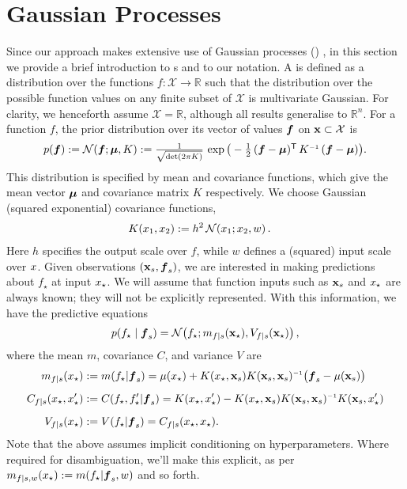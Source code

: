 \documentclass[twoside]{article}
\begin{document}
\section{Gaussian Processes}
Since our  approach makes extensive use of Gaussian processes (\gp) \cite{GPsBook}, in this section we provide a brief introduction to \gp s and to our notation. A \gpb is defined as a distribution over the functions $f: \mathcal{X} \rightarrow \mathbb{R}$ such that the distribution over the possible function values on any finite subset of $\mathcal{X}$ is multivariate Gaussian. For clarity, we henceforth assume $\mathcal{X} = \mathbb{R}$, although all results generalise to $\mathbb{R}^n$. For a function $f$, the prior distribution over its vector of values $\vf$ on $\vlfv \subset \mathcal{X}$ is
\begin{align}%
\textstyle
 \po{\vf}\deq \N{\vf}{\vmu}{K}
 \deq\frac{1}{\sqrt{\det({2\pi K})}}\,\exp \big(-\frac{1}{2}\,(\vf-\vmu)\tra\,K\inv\,(\vf-\vmu)\big).
\end{align}
This distribution is specified by mean and covariance functions, which give the mean vector $\vmu$ and covariance matrix $K$ respectively. 
We choose Gaussian (squared exponential) covariance functions,
\begin{align} \label{eq:Gaussian_cov_fn}
\textstyle
K(\lfv_1,\lfv_2)& \deq h^2\,\N{\lfv_1}{\lfv_2}{w}.
\end{align} 
Here $h$ specifies the output scale over $f$, while $w$ defines a (squared) input scale over $\lfv$. 
Given observations $(\vlfv_s,\vf_s)$, we are interested in making predictions about  $f_\star$ at input $\lfv_\star$. We will assume that function inputs such as $\vlfv_s$ and $\lfv_\star$ are always known; they will not be explicitly represented. With this information, we have the predictive equations
\begin{equation}
 \pskinny{f\st}{\vf_s} = 
\bN{f\st}
{\meancond{f}{\vlfv_\star}{s}}
{\covcond{f}{\vlfv_\star}{s}}\,,
\end{equation}
where the mean $m$, covariance $C$, and variance $V$ are
\begin{align} 
\textstyle
\meancond{f}{\lfv_\star}{s}
& \deq \mean{f_\star}{\vf_s}
= \mu(\lfv_\star)+
K(\lfv_\star,\vlfv_s)
K(\vlfv_s,\vlfv_s)\inv
\bigl(\vf_s-{\mu}(\vlfv_s)\bigr)\label{eq:GPMean}
\\[0.2cm]
C_{f|s}(\lfv_\star, \lfv'_\star)
& \deq C(f_\star,f'_\star|\vf_s) 
=K(\lfv_\star,\lfv'_\star) - 
K(\lfv_\star,\vlfv_s)
K(\vlfv_s,\vlfv_s)\inv
K(\vlfv_s,\lfv'_\star)%
\\[0.2cm]
\covcond{f}{\lfv_\star}{s}
&\deq {\cov{f_\star}{\vf_s}} 
= C_{f|s}(\lfv_\star, \lfv_\star).
\end{align} 
Note that the above assumes implicit conditioning on hyperparameters. Where required for disambiguation, we'll make this explicit, as per $m_{f|s,w}(x\st) \deq \mean{f\st}{\vf_s, w}$ and so forth.
\end{document}
